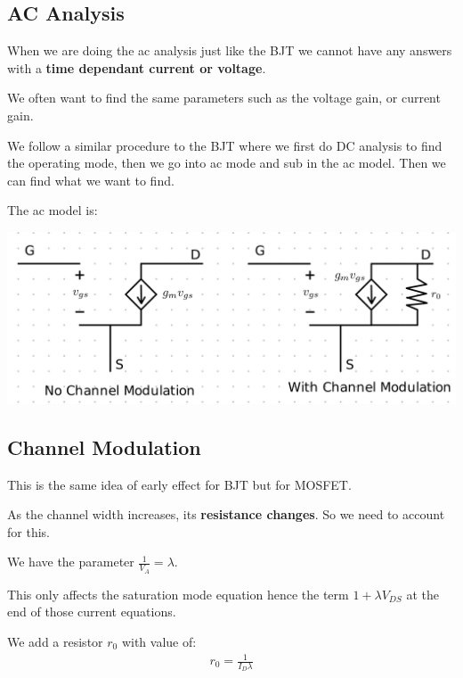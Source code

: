 \documentclass[12pt,letterpaper]{article} \usepackage{amsmath} \usepackage{graphicx} \usepackage[margin=1in]{geometry} \usepackage{longtable}  \usepackage{amssymb}
\begin{document}
	\subsection{AC Analysis}
	When we are doing the ac analysis just like the BJT we cannot have any answers with a \textbf{time dependant current or voltage}. 
	
	We often want to find the same parameters such as the voltage gain, or current gain. 
	
	We follow a similar procedure to the BJT where we first do DC analysis to find the operating mode, then we go into ac mode and sub in the ac model. Then we can find what we want to find. 
	
	The ac model is:
	\begin{center}
		\includegraphics[width=0.8\linewidth]{mosfet-ac-model}
	\end{center}

	\subsection{Channel Modulation}
	This is the same idea of early effect for BJT but for MOSFET. 
	
	As the channel width increases, its\textbf{ resistance changes}. So we need to account for this. 
	
	We have the parameter $\frac{1}{V_A} = \lambda$.
	
	This only affects the saturation mode equation hence the term $1+\lambda V_{DS}$ at the end of those current equations. 
	
	We add a resistor $r_0$ with value of:
	\begin{align*}
		r_0 = \frac{1}{I_D \lambda}
	\end{align*}
\end{document}

